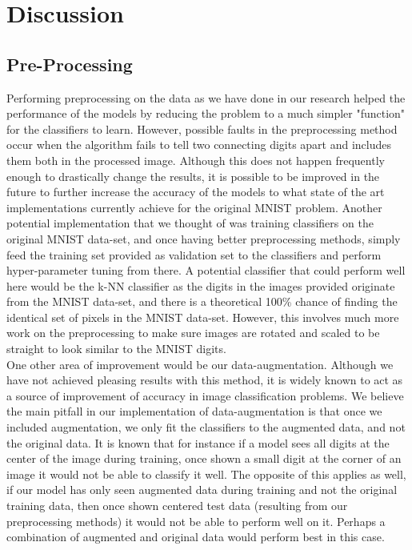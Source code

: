 \documentclass[twoside,twocolumn]{article}
\begin{document}
\section{Discussion}
\subsection{Pre-Processing}
Performing preprocessing on the data as we have done in our research helped the performance of the models by reducing the problem to a much simpler "function" for the classifiers to learn. However, possible faults in the preprocessing method occur when the algorithm fails to tell two connecting digits apart and includes them both in the processed image. Although this does not happen frequently enough to drastically change the results, it is possible to be improved in the future to further increase the accuracy of the models to what state of the art implementations currently achieve for the original MNIST problem. Another potential implementation that we thought of was training classifiers on the original MNIST data-set, and once having better preprocessing methods, simply feed the training set provided as validation set to the classifiers and perform hyper-parameter tuning from there. A potential classifier that could perform well here would be the k-NN classifier as the digits in the images provided originate from the MNIST data-set, and there is a theoretical 100\% chance of finding the identical set of pixels in the MNIST data-set. However, this involves much more work on the preprocessing to make sure images are rotated and scaled to be straight to look similar to the MNIST digits. \\
One other area of improvement would be our data-augmentation. Although we have not achieved pleasing results with this method, it is widely known to act as a source of improvement of accuracy in image classification problems. We believe the main pitfall in our implementation of data-augmentation is that once we included augmentation, we only fit the classifiers to the augmented data, and not the original data. It is known that for instance if a model sees all digits at the center of the image during training, once shown a small digit at the corner of an image it would not be able to classify it well. The opposite of this applies as well, if our model has only seen augmented data during training and not the original training data, then once shown centered test data (resulting from our preprocessing methods) it would not be able to perform well on it. Perhaps a combination of augmented and original data would perform best in this case.
\end{document}
